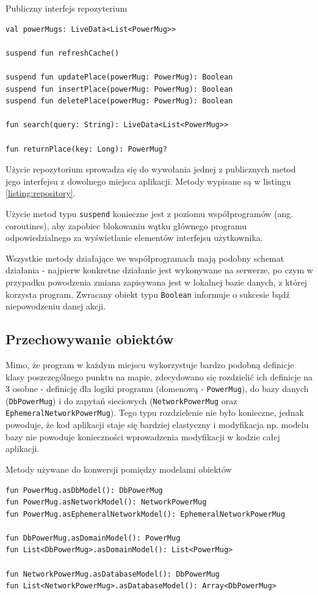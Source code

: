 \documentclass[polish,polish,a4paper,12pt]{article}
\begin{document}
	\begin{listing}[H]
		\caption{Publiczny interfejs repozyterium}
		\begin{verbatim}
val powerMugs: LiveData<List<PowerMug>>

suspend fun refreshCache()

suspend fun updatePlace(powerMug: PowerMug): Boolean
suspend fun insertPlace(powerMug: PowerMug): Boolean
suspend fun deletePlace(powerMug: PowerMug): Boolean

fun search(query: String): LiveData<List<PowerMug>>

fun returnPlace(key: Long): PowerMug?
		\end{verbatim}
		\label{listing:repository}
	\end{listing}

	Użycie repozytorium sprowadza się do wywołania jednej z publicznych metod jego interfejsu z dowolnego miejsca aplikacji. Metody wypisane są w listingu \ref{listing:repository}.

	Użycie metod typu \texttt{suspend} konieczne jest z poziomu współprogramów (ang. coroutines), aby zapobiec blokowaniu wątku głównego programu odpowiedzialnego za wyświetlanie elementów interfejsu użytkownika.

	Wszystkie metody działające we współprogramach mają podobny schemat działania - najpierw konkretne działanie jest wykonywane na serwerze, po czym w przypadku powodzenia zmiana zapisywana jest w lokalnej bazie danych, z której korzysta program. Zwracany obiekt typu \texttt{Boolean} informuje o sukcesie bądź niepowodzeniu danej akcji.

	\subsection{Przechowywanie obiektów}

	Mimo, że program w każdym miejscu wykorzystuje bardzo podobną definicje klasy poszczególnego punktu na mapie, zdecydowano się rozdzielić ich definicje na 3 osobne - definicję dla logiki programu (domenową - \texttt{PowerMug}), do bazy danych (\texttt{DbPowerMug}) i do zapytań sieciowych (\texttt{NetworkPowerMug} oraz \texttt{EphemeralNetworkPowerMug}). Tego typu rozdzielenie nie było konieczne, jednak powoduje, że kod aplikacji staje się bardziej elastyczny i modyfikacja np. modelu bazy nie powoduje konieczności wprowadzenia modyfikacji w kodzie całej aplikacji.

	\begin{listing}[H]
		\caption{Metody używane do konwersji pomiędzy modelami obiektów}
		\begin{verbatim}
fun PowerMug.asDbModel(): DbPowerMug
fun PowerMug.asNetworkModel(): NetworkPowerMug
fun PowerMug.asEphemeralNetworkModel(): EphemeralNetworkPowerMug

fun DbPowerMug.asDomainModel(): PowerMug
fun List<DbPowerMug>.asDomainModel(): List<PowerMug>

fun NetworkPowerMug.asDatabaseModel(): DbPowerMug
fun List<NetworkPowerMug>.asDatabaseModel(): Array<DbPowerMug>
		\end{verbatim}
		\label{listing:model-conversion}
	\end{listing}
\end{document}
